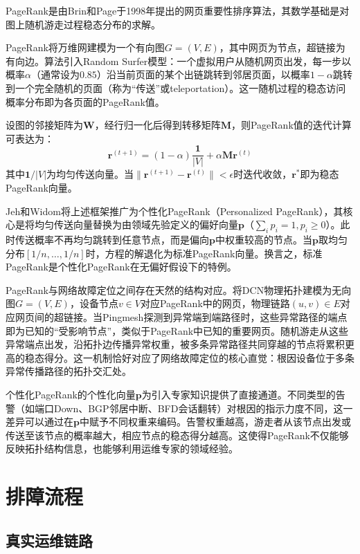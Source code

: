 PageRank是由Brin和Page于1998年提出的网页重要性排序算法，其数学基础是对图上随机游走过程稳态分布的求解。

PageRank将万维网建模为一个有向图$G=(V,E)$，其中网页为节点，超链接为有向边。算法引入Random Surfer模型：一个虚拟用户从随机网页出发，每一步以概率$\alpha$（通常设为$0.85$）沿当前页面的某个出链跳转到邻居页面，以概率$1-\alpha$跳转到一个完全随机的页面（称为“传送”或teleportation）。这一随机过程的稳态访问概率分布即为各页面的PageRank值。

设图的邻接矩阵为$\mathbf{W}$，经行归一化后得到转移矩阵$\mathbf{M}$，则PageRank值的迭代计算可表达为：
\begin{equation}
\mathbf{r}^{(t+1)} = (1-\alpha) \frac{\mathbf{1}}{|V|} + \alpha \mathbf{M} \mathbf{r}^{(t)}
\end{equation}
其中$\mathbf{1}/|V|$为均匀传送向量。当$\|\mathbf{r}^{(t+1)} - \mathbf{r}^{(t)}\| < \epsilon$时迭代收敛，$\mathbf{r}^*$即为稳态PageRank向量。

Jeh和Widom将上述框架推广为个性化PageRank（Personalized PageRank），其核心是将均匀传送向量替换为由领域先验定义的偏好向量$\mathbf{p}$（$\sum_i p_i = 1, p_i \ge 0$）。此时传送概率不再均匀跳转到任意节点，而是偏向$\mathbf{p}$中权重较高的节点。当$\mathbf{p}$取均匀分布$[1/n, \ldots, 1/n]$时，方程的解退化为标准PageRank向量。换言之，标准PageRank是个性化PageRank在无偏好假设下的特例。

PageRank与网络故障定位之间存在天然的结构对应。将DCN物理拓扑建模为无向图$G=(V,E)$，设备节点$v \in V$对应PageRank中的网页，物理链路$(u,v) \in E$对应网页间的超链接。当Pingmesh探测到异常端到端路径时，这些异常路径的端点即为已知的“受影响节点”，类似于PageRank中已知的重要网页。随机游走从这些异常端点出发，沿拓扑边传播异常权重，被多条异常路径共同穿越的节点将累积更高的稳态得分。这一机制恰好对应了网络故障定位的核心直觉：根因设备位于多条异常传播路径的拓扑交汇处。

个性化PageRank的个性化向量$\mathbf{p}$为引入专家知识提供了直接通道。不同类型的告警（如端口Down、BGP邻居中断、BFD会话翻转）对根因的指示力度不同，这一差异可以通过在$\mathbf{p}$中赋予不同权重来编码。告警权重越高，游走者从该节点出发或传送至该节点的概率越大，相应节点的稳态得分越高。这使得PageRank不仅能够反映拓扑结构信息，也能够利用运维专家的领域经验。

\chapter{排障流程}
\section{真实运维链路}

